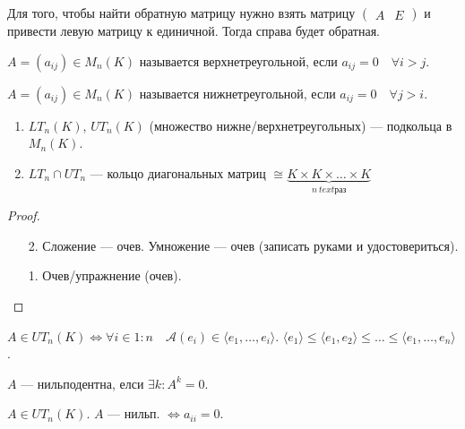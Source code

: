 \begin{statement}
    Для того, чтобы найти обратную матрицу нужно взять матрицу $\left(\begin{array}{c|c} A & E \end{array}\right)$ и привести левую матрицу к единичной. Тогда справа будет обратная.
\end{statement}
\begin{definition}
    $A = (a_{ij}) \in M_n(K)$ называется верхнетреугольной, если  $a_{ij} = 0 \quad \forall i > j$.

     $A = (a_{ij}) \in M_n(K)$ называется нижнетреугольной, если  $a_{ij} = 0 \quad \forall j > i$.
\end{definition}
\begin{statement}
    \begin{enumerate}
        \item $LT_n(K)$,  $UT_n(K)$ (множество нижне/верхнетреугольных) --- подкольца в  $M_n(K)$.
        \item $LT_n \cap UT_n$ --- кольцо диагональных матриц  $\cong \underbrace{K \times K \times \ldots \times K}_{n\ text{раз}}$
    \end{enumerate}
\end{statement}
\begin{proof}
    \slashn
    \begin{enumerate}
        \item[2.] Сложение --- очев. Умножение --- очев (записать руками и удостовериться).
        \item [1.] Очев/упражнение (очев). 
    \end{enumerate}
\end{proof}
\begin{remark}
    $A \in UT_n(K) \iff \forall i \in 1:n\quad \mathcal{A}(e_i) \in \langle e_1, \ldots, e_i \rangle$. $\langle e_1 \rangle \le \langle e_1, e_2 \rangle \le \ldots \le \langle e_1, \ldots, e_n \rangle$. 
\end{remark}
\begin{definition}
    $A$ --- нильподентна, елси $\exists k\!: A^k = 0$. 
\end{definition}
\begin{statement}
    $A \in UT_n(K)$.  $A$ --- нильп.  $\iff a_{ii} = 0$.
\end{statement}
